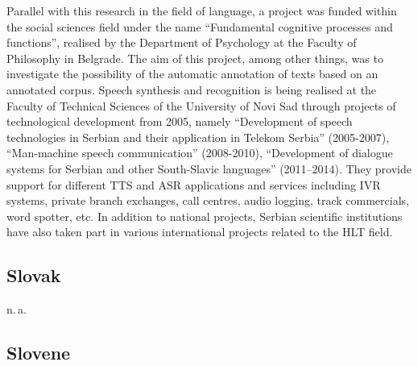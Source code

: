 \documentclass[10pt, plain]{../../metanetpaper}
\begin{document}
\begin{multicols}{2}
Parallel with this research in the field of language, a project was funded within the social sciences field under the name “Fundamental cognitive processes and functions”, realised by the Department of Psychology at the Faculty of Philosophy in Belgrade. The aim of this project, among other things, was to investigate the possibility of the automatic annotation of texts based on an annotated corpus.  Speech synthesis and recognition is being realised at the Faculty of Technical Sciences of the University of Novi Sad through projects of technological development from 2005, namely “Development of speech technologies in Serbian and their application in Telekom Serbia” (2005-2007), “Man-machine speech communication” (2008-2010), “Development of dialogue systems for Serbian and other South-Slavic languages” (2011–2014). They provide support for different TTS and ASR applications and services including IVR systems, private branch exchanges, call centres, audio logging, track commercials, word spotter, etc.  In addition to national projects, Serbian scientific institutions have also taken part in various international projects related to the HLT field.

\subsection*{Slovak}
\label{sec:slovak}

n.\,a.

\subsection*{Slovene}
\label{sec:slovene}


\end{multicols}
\end{document}
